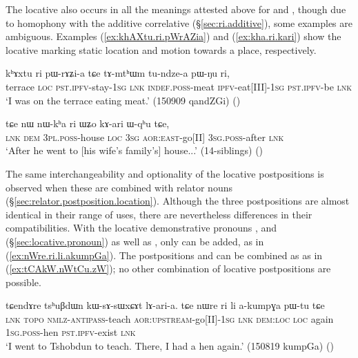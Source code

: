  The locative  also occurs in all the meanings attested above for  and , though due to homophony with the additive correlative  (§\ref{sec:ri.additive}), some examples are ambiguous. Examples (\ref{ex:khAXtu.ri.pWrAZia}) and (\ref{ex:kha.ri.kari}) show the locative  marking static location and motion towards a place, respectively.

\begin{exe}
\ex \label{ex:khAXtu.ri.pWrAZia}
\gll   kʰɤxtu ri pɯ-rɤʑi-a tɕe tɤ-mtʰɯm tu-ndze-a pɯ-ŋu ri, \\
terrace \textsc{loc} \textsc{pst}.\textsc{ipfv}-stay-\textsc{1sg} \textsc{lnk} \textsc{indef}.\textsc{poss}-meat \textsc{ipfv}-eat[III]-\textsc{1sg} \textsc{pst}.\textsc{ipfv}-be \textsc{lnk} \\
\glt `I was on the terrace eating meat.' (150909 qandZGi) ()
 \end{exe}
 
 \begin{exe}
\ex \label{ex:kha.ri.kari}
\gll   tɕe nɯ nɯ-kʰa ri ɯʑo kɤ-ari ɯ-qʰu tɕe, \\
\textsc{lnk} \textsc{dem} \textsc{3pl}.\textsc{poss}-house \textsc{loc} \textsc{3sg} \textsc{aor}:\textsc{east}-go[II] \textsc{3sg}.\textsc{poss}-after \textsc{lnk} \\
\glt `After he went to [his wife's family's] house...' (14-siblings) ()
  \end{exe}
  
The same interchangeability and optionality of the locative postpositions is observed when these are combined with relator nouns (§\ref{sec:relator.postposition.location}). Although the three postpositions are almost identical in their range of uses, there are nevertheless differences in their compatibilities.  With the locative demonstrative pronouns , and   (§\ref{sec:locative.pronoun}) as well as , only  can be added, as in (\ref{ex:nWre.ri.li.akumpGa}). The postpositions  and  can be combined as  as in (\ref{ex:tCAkW.nWtCu.zW}); no other combination of locative postpositions are possible.

 \begin{exe}
\ex \label{ex:nWre.ri.li.akumpGa}
\gll tɕendɤre tsʰuβdɯn kɯ-sɤ-sɯxɕɤt lɤ-ari-a. tɕe nɯre ri li a-kumpɣa pɯ-tu tɕe \\
\textsc{lnk}  \textsc{topo} \textsc{nmlz}-\textsc{antipass}-teach \textsc{aor}:\textsc{upstream}-go[II]-\textsc{1sg} \textsc{lnk} \textsc{dem}:\textsc{loc} \textsc{loc} again \textsc{1sg}.\textsc{poss}-hen \textsc{pst}.\textsc{ipfv}-exist \textsc{lnk} \\
\glt `I went to Tshobdun to teach. There, I had a hen again.' (150819 kumpGa) ()
  \end{exe}

